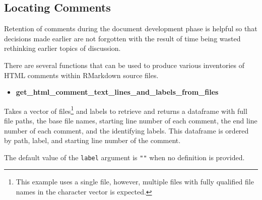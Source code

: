 \documentclass[
]{article}
\providecommand{\tightlist}{%
  \setlength{\itemsep}{0pt}\setlength{\parskip}{0pt}}
\begin{document}
\hypertarget{locating-comments}{%
\subsection{Locating Comments}\label{locating-comments}}

Retention of comments during the document development phase is helpful
so that decisions made earlier are not forgotten with the result of time
being wasted rethinking earlier topics of discussion.

There are several functions that can be used to produce various
inventories of HTML comments within RMarkdown source files.

\begin{itemize}
\tightlist
\item
  \textbf{get\_html\_comment\_text\_lines\_and\_labels\_from\_files}
\end{itemize}

Takes a vector of files\footnote{This example uses a single file,
  however, multiple files with fully qualified file names in the
  character vector is expected.} and labels to retrieve and returns a
dataframe with full file paths, the base file names, starting line
number of each comment, the end line number of each comment, and the
identifying labels. This dataframe is ordered by path, label, and
starting line number of the comment.

The default value of the \texttt{label} argument is \texttt{""} when no
definition is provided.
\end{document}
